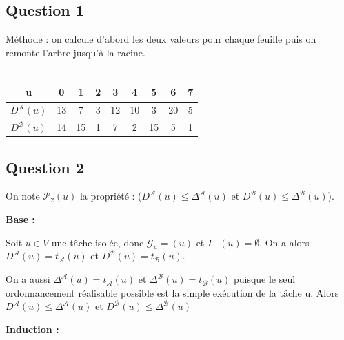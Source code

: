 \documentclass{article}
\begin{document}
\subsection{Question 1}
Méthode : on calcule d'abord les deux valeurs pour chaque feuille puis on remonte l'arbre jusqu'à la racine.  \\
\\
\begin{tabular}{|c|c|c|c|c|c|c|c|c|}
  \hline
  u & 0 & 1 & 2 & 3 & 4 & 5 & 6 & 7 \\
  \hline
  $D^{\mathcal{A}}(u)$ & 13 & 7 & 3 & 12 & 10 & 3 & 20 & 5 \\
  \hline
  $D^{\mathcal{B}}(u)$ & 14 & 15 & 1 & 7 & 2 & 15 & 5 & 1 \\
  \hline
\end{tabular}
\subsection{Question 2}
On note $\mathcal{P}_2(u)$ la propriété : ($D^{\mathcal{A}}(u) \leq \Delta^{\mathcal{A}}(u)$ et $D^{\mathcal{B}}(u) \leq \Delta^{\mathcal{B}}(u)$).
\begin{flushleft}
    \bf
    \underline{Base :}
\end{flushleft}

Soit $u \in V$ une tâche isolée, donc $\mathcal{G}_u=(u)$ et $\Gamma^{+}(u) = \emptyset$.
On a alors $D^{\mathcal{A}}(u) = t_{\mathcal{A}}(u)$ et $D^{\mathcal{B}}(u) = t_{\mathcal{B}}(u)$.

On a aussi $\Delta^{\mathcal{A}}(u) = t_{\mathcal{A}}(u)$ et $\Delta^{\mathcal{B}}(u) = t_{\mathcal{B}}(u)$ puisque le seul ordonnancement réalisable possible est la simple exécution de la tâche u. Alors $D^{\mathcal{A}}(u) \leq \Delta^{\mathcal{A}}(u)$ et $D^{\mathcal{B}}(u) \leq \Delta^{\mathcal{B}}(u)$ 
\begin{flushleft}
    \bf
    \underline{Induction :}
\end{flushleft}
\end{document}
